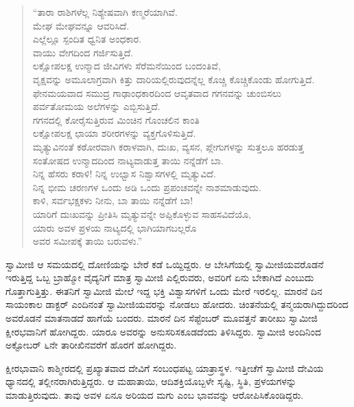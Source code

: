 \begin{verse}
“ತಾರಾ ರಾಶಿಗಳೆಲ್ಲ ನಿಶ್ಯೇಷವಾಗಿ ಕಣ್ಮರೆಯಾಗಿವೆ.\\ಮೇಘ ಮೇಘವನ್ನೂ ಆವರಿಸಿದೆ.\\ಎಲ್ಲೆಲ್ಲೂ ಸ್ಪಂದಿತ ಧ್ವನಿತ ಅಂಧಕಾರ.\\ವಾಯು ವೇಗದಿಂದ ಗರ್ಜಿಸುತ್ತಿದೆ.\\ಲಕ್ಷೋಪಲಕ್ಷ ಉನ್ಮಾದ ಜೀವಿಗಳು ಸೆರೆಮನೆಯಿಂದ ಬಂದಂತಿವೆ,\\ವೃಕ್ಷವನ್ನು ಅಮೂಲಾಗ್ರವಾಗಿ ಕಿತ್ತು ದಾರಿಯಲ್ಲಿರುವುದನ್ನೆಲ್ಲ ಕೊಚ್ಚಿ ಕೊಚ್ಚಿಕೊಂಡು ಹೋಗುತ್ತಿದೆ.\\ಫೇನಮಯವಾದ ಸಮುದ್ರ ಗಾಢಾಂಧಕಾರದಿಂದ ಆವೃತವಾದ ಗಗನವನ್ನು ಚುಂಬಿಸಲು\\ಪರ್ವತೋಮಯ ಅಲೆಗಳನ್ನು ಎಬ್ಬಿಸುತ್ತಿದೆ.\\ಗಗನದಲ್ಲಿ ಕೋರೈಸುತ್ತಿರುವ ಮಿಂಚಿನ ಗೊಂಚಲಿನ ಕಾಂತಿ\\ಲಕ್ಷೋಪಲಕ್ಷ ಛಾಯಾ ಶರೀರಗಳನ್ನು ವ್ಯಕ್ತಗೊಳಿಸುತ್ತಿದೆ.\\ಮೃತ್ಯುವಿನಂತೆ ಕಠೋರವಾಗಿ ಕರಾಳವಾಗಿ, ದುಃಖ, ವ್ಯಸನ, ಪ್ಲೇಗುಗಳನ್ನು ಸುತ್ತಲೂ ಹರಡುತ್ತ\\ಸಂತೋಷದ ಉನ್ಮಾದದಿಂದ ನಾಟ್ಯವಾಡುತ್ತ ತಾಯಿ ನನ್ನೆಡೆಗೆ ಬಾ.\\ನಿನ್ನ ಹೆಸರು ಕರಾಳಿ! ನಿನ್ನ ಉಛ್ವಾಸ ನಿಶ್ವಾಸಗಳಲ್ಲಿ ಮೃತ್ಯುವಿದೆ.\\ನಿನ್ನ ಭೀಮ ಚರಣಗಳ ಒಂದು ಅಡಿ ಒಂದು ಪ್ರಪಂಚವನ್ನೇ ನಾಶಮಾಡುವುದು.\\ಕಾಳಿ, ಸರ್ವಭಕ್ಷಕಳು ನೀನು, ಬಾ ತಾಯಿ ನನ್ನೆಡೆಗೆ ಬಾ!\\ಯಾರಿಗೆ ದುಃಖವನ್ನು ಪ್ರೀತಿಸಿ ಮೃತ್ಯುವನ್ನೇ ಅಪ್ಪಿಕೊಳ್ಳುವ ಸಾಹಸವಿದೆಯೊ,\\ಯಾರು ಅವಳ ಪ್ರಳಯ ನಾಟ್ಯದಲ್ಲಿ ಭಾಗಿಯಾಗಬಲ್ಲರೊ\\ಅವರ ಸಮೀಪಕ್ಕೆ ತಾಯಿ ಬರುವಳು.”
\end{verse}

 ಸ್ವಾಮೀಜಿ ಆ ಸಮಯದಲ್ಲಿ ದೋಣಿಯನ್ನು ಬೇರೆ ಕಡೆ ಒಯ್ದಿದ್ದರು. ಆ ಬೇಸಿಗೆಯಲ್ಲಿ ಸ್ವಾಮೀಜಿಯವರೊಡನೆ ಇರುತ್ತಿದ್ದ ಒಬ್ಬ ಬ್ರಾಹ್ಮೋ ವೈದ್ಯನಿಗೆ ಮಾತ್ರ ಸ್ವಾಮೀಜಿ ಎಲ್ಲಿರುವರು, ಅವರಿಗೆ ಏನು ಬೇಕಾಗಿದೆ ಎಂಬುದು ಗೊತ್ತಾಗುತ್ತಿತ್ತು. ಈತನಿಗೆ ಸ್ವಾಮೀಜಿ ಮೇಲೆ ಇದ್ದ ಭಕ್ತಿ ವಿಶ್ವಾಸಗಳಿಗೆ ಒಂದು ಮೇರೆ ಇರಲಿಲ್ಲ. ಮಾರನೆ ದಿನ ಸಾಯಂಕಾಲ ಡಾಕ್ಟರ್ ಎಂದಿನಂತೆ ಸ್ವಾಮೀಜಿಯವರನ್ನು ನೋಡಲು ಹೋದರು. ಚಿಂತನೆಯಲ್ಲಿ ತನ್ಮಯರಾಗಿದ್ದುದರಿಂದ ಅವರೊಡನೆ ಮಾತನಾಡದೆ ಹಾಗೆಯೆ ಬಂದರು. ಮಾರನೆ ದಿನ ಸೆಪ್ಟೆಂಬರ್ ಮೂವತ್ತನೆ ತಾರೀಖು ಸ್ವಾಮೀಜಿ ಕ್ಷೀರಭವಾನಿಗೆ ಹೋಗಿದ್ದರು. ಯಾರೂ ಅವರನ್ನು ಅನುಸರಿಸಕೂಡದೆಂದು ತಿಳಿಸಿದ್ದರು. ಸ್ವಾಮೀಜಿ ಅಂದಿನಿಂದ ಅಕ್ಟೋಬರ್ ೬ನೇ ತಾರೀಖಿನವರೆಗೆ ಹೊರಗೆ ಹೋಗಿದ್ದರು. 

 ಕ್ಷೀರಭಾವಾನಿ ಕಾಶ್ಮೀರದಲ್ಲಿ ಪ್ರಖ್ಯಾತವಾದ ದೇವಿಗೆ ಸಂಬಂಧಪಟ್ಟ ಯಾತ್ರಾಸ್ಥಳ. ಇತ್ತೀಚೆಗೆ ಸ್ವಾಮೀಜಿ ದೇವಿಯ ಧ್ಯಾನದಲ್ಲಿ ತಲ್ಲೀನರಾಗಿರುತ್ತಿದ್ದರು. ಆ ಮಹಾತಾಯಿ, ಆದಿಶಕ್ತಿಯೊಬ್ಬಳೇ ಸೃಷ್ಟಿ, ಸ್ಥಿತಿ, ಪ್ರಳಯಗಳನ್ನು ಮಾಡುತ್ತಿರುವುದು. ತಾವು ಅವಳ ಏನೂ ಅರಿಯದ ಮಗು ಎಂಬ ಭಾವವನ್ನು ಆರೋಪಿಸಿಕೊಂಡಿದ್ದರು. 


